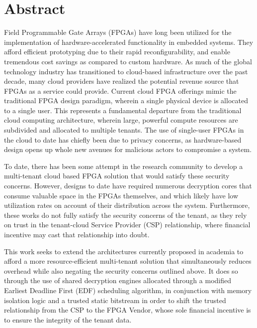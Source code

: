 
\pagestyle{empty}
\chapter{Abstract}\label{ch:abstract}
Field Programmable Gate Arrays (FPGAs) have long been utilized for the implementation of hardware-accelerated functionality in embedded systems. They afford efficient prototyping due to their rapid reconfigurability, and enable tremendous cost savings as compared to custom hardware. As much of the global technology industry has transitioned to cloud-based infrastructure over the past decade, many cloud providers have realized the potential revenue source that FPGAs as a service could provide. Current cloud FPGA offerings mimic the traditional FPGA design paradigm, wherein a single physical device is allocated to a single user. This represents a fundamental departure from the traditional cloud computing architecture, wherein large, powerful compute resources are subdivided and allocated to multiple tenants. The use of single-user FPGAs in the cloud to date has chiefly been due to privacy concerns, as hardware-based design opens up whole new avenues for malicious actors to compromise a system.

To date, there has been some attempt in the research community to develop a multi-tenant cloud based FPGA solution that would satisfy these security concerns. However, designs to date have required numerous decryption cores that consume valuable space in the FPGAs themselves, and which likely have low utilization rates on account of their distribution across the system. Furthermore, these works do not fully satisfy the security concerns of the tenant, as they rely on trust in the tenant-cloud Service Provider (CSP) relationship, where financial incentive may cast that relationship into doubt.

This work seeks to extend the architectures currently proposed in academia to afford a more resource-efficient multi-tenant solution that simultaneously reduces overhead while also negating the security concerns outlined above. It does so through the use of shared decryption engines allocated through a modified Earliest Deadline First (EDF) scheduling algorithm, in conjunction with memory isolation logic and a trusted static bitstream in order to shift the trusted relationship from the CSP to the FPGA Vendor, whose sole financial incentive is to ensure the integrity of the tenant data.